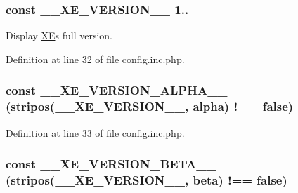 \subsubsection[{\texorpdfstring{\+\_\+\+\_\+\+X\+E\+\_\+\+V\+E\+R\+S\+I\+O\+N\+\_\+\+\_\+}{__XE_VERSION__}}]{\setlength{\rightskip}{0pt plus 5cm}const \+\_\+\+\_\+\+X\+E\+\_\+\+V\+E\+R\+S\+I\+O\+N\+\_\+\+\_\+ \textquotesingle{}1..\textquotesingle{}}\hypertarget{config_8inc_8php_afceaaec30d0e5b6a78d0ae28bcbfc8f3}{}\label{config_8inc_8php_afceaaec30d0e5b6a78d0ae28bcbfc8f3}
Display \hyperlink{namespaceXE}{XE}\textquotesingle{}s full version. 

Definition at line 32 of file config.\+inc.\+php.

\subsubsection[{\texorpdfstring{\+\_\+\+\_\+\+X\+E\+\_\+\+V\+E\+R\+S\+I\+O\+N\+\_\+\+A\+L\+P\+H\+A\+\_\+\+\_\+}{__XE_VERSION_ALPHA__}}]{\setlength{\rightskip}{0pt plus 5cm}const \+\_\+\+\_\+\+X\+E\+\_\+\+V\+E\+R\+S\+I\+O\+N\+\_\+\+A\+L\+P\+H\+A\+\_\+\+\_\+ (stripos({\bf \+\_\+\+\_\+\+X\+E\+\_\+\+V\+E\+R\+S\+I\+O\+N\+\_\+\+\_\+}, \textquotesingle{}alpha\textquotesingle{}) !== false)}\hypertarget{config_8inc_8php_aaee982ed748e379cde978edfe8d433e1}{}\label{config_8inc_8php_aaee982ed748e379cde978edfe8d433e1}


Definition at line 33 of file config.\+inc.\+php.

\subsubsection[{\texorpdfstring{\+\_\+\+\_\+\+X\+E\+\_\+\+V\+E\+R\+S\+I\+O\+N\+\_\+\+B\+E\+T\+A\+\_\+\+\_\+}{__XE_VERSION_BETA__}}]{\setlength{\rightskip}{0pt plus 5cm}const \+\_\+\+\_\+\+X\+E\+\_\+\+V\+E\+R\+S\+I\+O\+N\+\_\+\+B\+E\+T\+A\+\_\+\+\_\+ (stripos({\bf \+\_\+\+\_\+\+X\+E\+\_\+\+V\+E\+R\+S\+I\+O\+N\+\_\+\+\_\+}, \textquotesingle{}beta\textquotesingle{}) !== false)}\hypertarget{config_8inc_8php_aac8a83557f3eab1d2d2583fe21559ca9}{}\label{config_8inc_8php_aac8a83557f3eab1d2d2583fe21559ca9}


